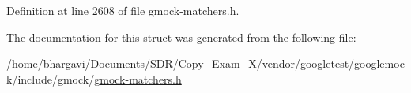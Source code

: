 Definition at line 2608 of file gmock-\/matchers.\+h.



The documentation for this struct was generated from the following file\+:\begin{DoxyCompactItemize}
\item 
/home/bhargavi/\+Documents/\+S\+D\+R/\+Copy\+\_\+\+Exam\+\_\+X/vendor/googletest/googlemock/include/gmock/\hyperlink{gmock-matchers_8h}{gmock-\/matchers.\+h}\end{DoxyCompactItemize}
